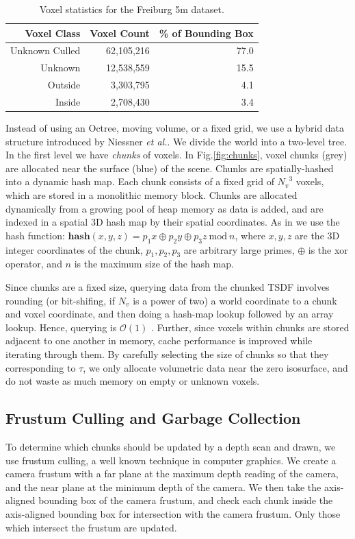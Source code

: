 \documentclass[conference]{IEEEtran}
\newcommand{\figref}[1]{Fig.\ref{#1}}
\newcommand{\etal}{\textit{et al.}\xspace}
\newcommand{\TSDF}{TSDF\xspace}
\begin{document}
\begin{table}[t!]
\centering
	\begin{tabular} {rrr}
	\toprule
	Voxel Class & Voxel Count & \% of Bounding Box \\ 
	\midrule
	Unknown Culled & 62,105,216 & 77.0 \\ 
	Unknown & 12,538,559 & 15.5 \\ 
	Outside & 3,303,795 & 4.1 \\ 
	Inside & 2,708,430 & 3.4 \\ 
	\bottomrule
	\end{tabular}
	\caption{Voxel statistics for the Freiburg 5m dataset.}
	\label{table:volumecount}  
\end{table}

Instead of using an Octree, moving volume, or a fixed grid, we use a hybrid data
structure introduced by Niessner \etal \cite{NiessnerHashing}. We divide
the world into a two-level tree. In the first level we have \emph{chunks} of
voxels.  In \figref{fig:chunks}, voxel chunks (grey) are allocated near the
surface (blue) of the scene. Chunks are spatially-hashed \cite{SpatialHashing}
into a dynamic hash map.  Each chunk consists of a fixed grid of ${N_v}^3$
voxels, which are stored in a monolithic memory block. Chunks are allocated
dynamically from a growing pool of heap memory as data is added, and are
indexed in a spatial 3D hash map \cite{SpatialHashing} by their spatial
coordinates. As in \cite{SpatialHashing, NiessnerHashing} we use the hash
function:  $ \textbf{hash}(x, y, z) = p_1 x\oplus p_2 y \oplus p_3 z
~\text{mod}~n $, where $x, y, z$ are the 3D integer coordinates of the chunk,
$p_1, p_2, p_3$ are arbitrary large primes, $\oplus$ is the xor operator, and $n$ is
the maximum size of the hash map.

Since chunks are a fixed size, querying data from the chunked \TSDF involves
rounding (or bit-shifing, if $N_v$ is a power of two) a world coordinate to a
chunk and voxel coordinate, and then doing a hash-map lookup followed by an
array lookup. Hence, querying is $\mathcal{O}(1)$ \cite{NiessnerHashing}.
Further, since voxels within chunks are stored adjacent to one another in
memory, cache performance is improved while iterating through them. By carefully
selecting the size of chunks so that they corresponding to $\tau$, we only
allocate volumetric data near the zero isosurface, and do not waste as much
memory on empty or unknown voxels.

\subsection{Frustum Culling and Garbage Collection}
\label{section:frustum}
To determine which chunks should be updated by a depth scan and drawn, we use
frustum culling, a well known technique in computer graphics. We  create a
camera frustum with a far plane at the maximum depth reading of the camera, and
the near plane at the minimum depth of the camera. We then take the 
axis-aligned bounding box of the camera frustum, and check each chunk inside the
axis-aligned bounding box for intersection with the camera frustum. Only those
which intersect the frustum are updated.
\end{document}
